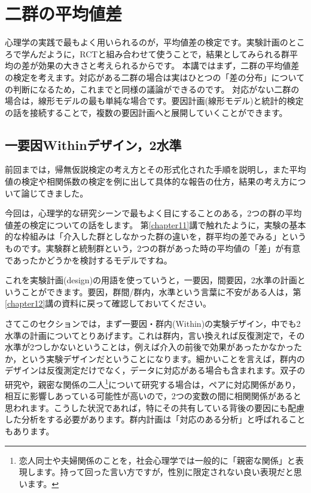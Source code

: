 \documentclass{ltjsbook}
\begin{document}
\chapter{二群の平均値差}
\label{chapter20} 

心理学の実践で最もよく用いられるのが，平均値差の検定です。実験計画のところで学んだように，RCTと組み合わせて使うことで，結果としてみられる群平均の差が効果の大きさと考えられるからです。
本講ではまず，二群の平均値差の検定を考えます。対応がある二群の場合は実はひとつの「差の分布」についての判断になるため，これまでと同様の議論ができるのです。
対応がない二群の場合は，線形モデルの最も単純な場合です。要因計画(線形モデル)と統計的検定の話を接続することで，複数の要因計画へと展開していくことができます。

\section{一要因Withinデザイン，2水準}
前回までは，帰無仮説検定の考え方とその形式化された手順を説明し，また平均値の検定や相関係数の検定を例に出して具体的な報告の仕方，結果の考え方について論じてきました。

今回は，心理学的な研究シーンで最もよく目にすることのある，2つの群の平均値差の検定についての話をします。
第\ref{chapter11}講で触れたように，実験の基本的な枠組みは「介入した群としなかった群の違いを，群平均の差でみる」というものです。実験群と統制群という，2つの群があった時の平均値の「差」が有意であったかどうかを検討するモデルですね。

これを実験計画(design)の用語を使っていうと，一要因，間要因，2水準の計画ということができます。要因，群間/群内，水準という言葉に不安がある人は，第\ref{chapter12}講の資料に戻って確認しておいてください。

さてこのセクションでは，まず一要因・群内(Within)の実験デザイン，中でも2水準の計画についてとりあげます。これは群内，言い換えれば反復測定で，その水準が2つしかないということは，例えば介入の前後で効果があったかなかったか，という実験デザインだということになります。細かいことを言えば，群内のデザインは反復測定だけでなく，データに対応がある場合も含まれます。双子の研究や，親密な関係の二人\footnote{恋人同士や夫婦関係のことを，社会心理学では一般的に「親密な関係」と表現します。持って回った言い方ですが，性別に限定されない良い表現だと思います。}について研究する場合は，ペアに対応関係があり，相互に影響しあっている可能性が高いので，2つの変数の間に相関関係があると思われます。こうした状況であれば，特にその共有している背後の要因にも配慮した分析をする必要があります。群内計画は「対応のある分析」と呼ばれることもあります。
\end{document}
